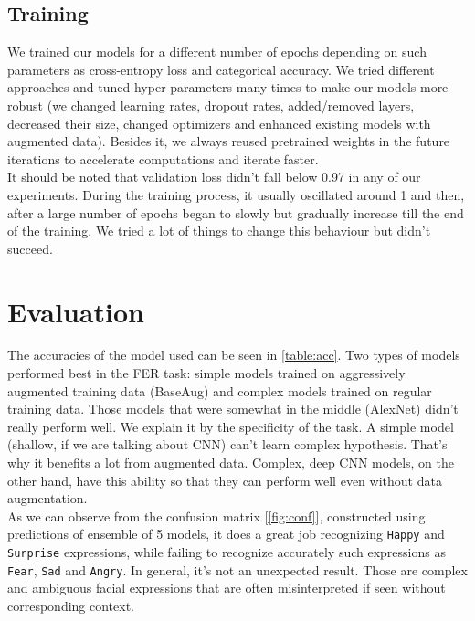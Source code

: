 \subsection{Training}

We trained our models for a different number of epochs depending on such parameters as cross-entropy loss and categorical accuracy. We tried different approaches and tuned hyper-parameters many times to make our models more robust (we changed learning rates, dropout rates, added/removed layers, decreased their size, changed optimizers and enhanced existing models with augmented data). Besides it, we always reused pretrained weights in the future iterations to accelerate computations and iterate faster.\\

It should be noted that validation loss didn't fall below 0.97 in any of our experiments. During the training process, it usually oscillated around 1 and then, after a large number of epochs began to slowly but gradually increase till the end of the training. We tried a lot of things to change this behaviour but didn't succeed.

\section{Evaluation}

The accuracies of the model used can be seen in \ref{table:acc}. Two types of models performed best in the FER task: simple models trained on aggressively augmented training data (BaseAug) and complex models trained on regular training data. Those models that were somewhat in the middle (AlexNet) didn't really perform well. We explain it by the specificity of the task. A simple model (shallow, if we are talking about CNN) can't learn complex hypothesis. That's why it benefits a lot from augmented data. Complex, deep CNN models, on the other hand, have this ability so that they can perform well even without data augmentation.\\

As we can observe from the confusion matrix [\ref{fig:conf}], constructed using predictions of ensemble of 5 models, it does a great job recognizing \texttt{Happy} and \texttt{Surprise} expressions, while failing to recognize accurately such expressions as \texttt{Fear}, \texttt{Sad} and \texttt{Angry}. In general, it's not an unexpected result. Those are complex and ambiguous facial expressions that are often misinterpreted if seen without corresponding context. 

